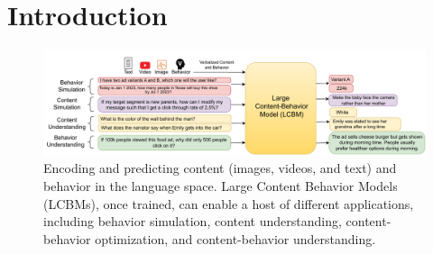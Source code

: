 
\section{Introduction}
\label{ref:Introduction}

\begin{figure}[!ht]
    \centering
    \includegraphics[width=\textwidth]{images/fig1-lcbm.pdf}
    \caption{Encoding and predicting content (images, videos, and text) and behavior in the language space. Large Content Behavior Models (LCBMs), once trained, can enable a host of different applications, including behavior simulation, content understanding, content-behavior optimization, and content-behavior understanding.}
    \label{fig:figure-1-lcbm}
\end{figure}

